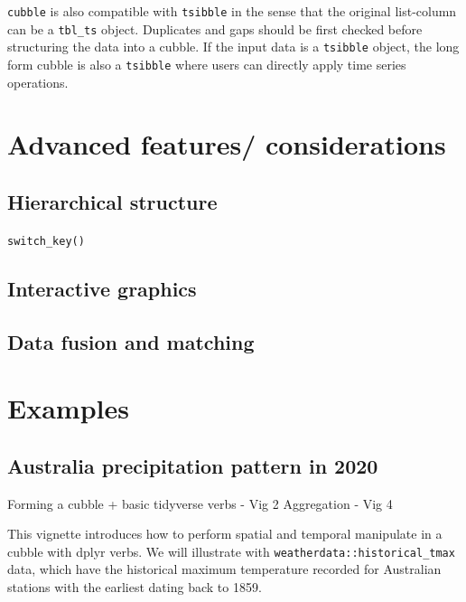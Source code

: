 \documentclass[
]{jss}
\begin{document}
\texttt{cubble} is also compatible with \texttt{tsibble} in the sense
that the original list-column can be a \texttt{tbl\_ts} object.
Duplicates and gaps should be first checked before structuring the data
into a cubble. If the input data is a \texttt{tsibble} object, the long
form cubble is also a \texttt{tsibble} where users can directly apply
time series operations.

\hypertarget{advanced-features-considerations}{%
\section{Advanced features/
considerations}\label{advanced-features-considerations}}

\hypertarget{hierarchical-structure}{%
\subsection{Hierarchical structure}\label{hierarchical-structure}}

\texttt{switch\_key()}

\hypertarget{interactive-graphics}{%
\subsection{Interactive graphics}\label{interactive-graphics}}

\hypertarget{data-fusion-and-matching}{%
\subsection{Data fusion and matching}\label{data-fusion-and-matching}}

\newpage

\hypertarget{examples}{%
\section{Examples}\label{examples}}

\hypertarget{australia-precipitation-pattern-in-2020}{%
\subsection{Australia precipitation pattern in
2020}\label{australia-precipitation-pattern-in-2020}}

Forming a cubble + basic tidyverse verbs - Vig 2 Aggregation - Vig 4

This vignette introduces how to perform spatial and temporal manipulate
in a cubble with dplyr verbs. We will illustrate with
\texttt{weatherdata::historical\_tmax} data, which have the historical
maximum temperature recorded for Australian stations with the earliest
dating back to 1859.
\end{document}
